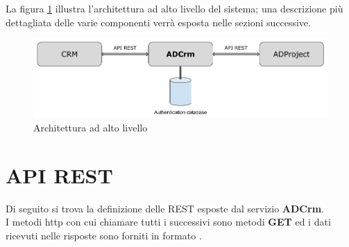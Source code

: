 La figura \ref{fig:architetturasistema} illustra l'architettura ad alto livello del sistema; una descrizione più dettagliata delle varie componenti verrà esposta nelle sezioni successive.

\begin{figure}[H]
	\centering
	\includegraphics[width=\linewidth]{images/architettura_sistema}
	\caption{Architettura ad alto livello}
	\label{fig:architetturasistema}
\end{figure}

\section{API REST}\label{apiRest}
Di seguito si trova la definizione delle  REST esposte dal servizio \textbf{ADCrm}.\\
I metodi \gls{http} con cui chiamare tutti i successivi  sono metodi \textbf{GET} ed i dati ricevuti nelle risposte sono forniti in formato .

